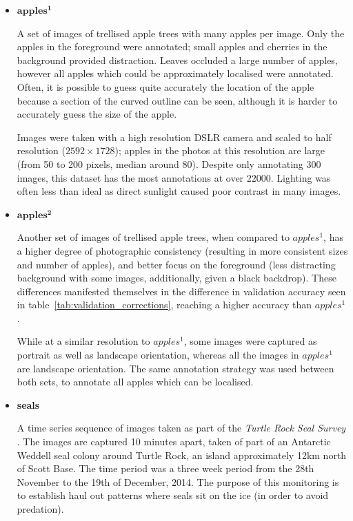 \begin{itemize}
    \item{$\mathbf{apples^1}$}

A set of images of trellised apple trees with many apples per image. Only the apples in the foreground were annotated; small apples and cherries in the background provided distraction. Leaves occluded a large number of apples, however all apples which could be approximately localised were annotated. Often, it is possible to guess quite accurately the location of the apple because a section of the curved outline can be seen, although it is harder to accurately guess the size of the apple. 

Images were taken with a high resolution DSLR camera and scaled to half resolution ($2592\times1728$); apples in the photos at this resolution are large (from 50 to 200 pixels, median around 80). Despite only annotating 300 images, this dataset has the most annotations at over $22000$. Lighting was often less than ideal as direct sunlight caused poor contrast in many images.
    
    \item{$\mathbf{apples^2}$}
    
Another set of images of trellised apple trees, when compared to \emph{$apples^1$}, has a higher degree of  photographic consistency (resulting in more consistent sizes and number of apples), and better focus on the foreground (less distracting background with some images, additionally, given a black backdrop). These differences manifested themselves in the difference in validation accuracy seen in table~\ref{tab:validation_corrections}, reaching a higher accuracy than \emph{$apples^1$}.

While at a similar resolution to \emph{$apples^1$}, some images were captured as portrait as well as landscape orientation, whereas all the images in \emph{$apples^1$} are landscape orientation. The same annotation strategy was used between both sets, to annotate all apples which can be localised.

    \item{\bf{seals}}
    
 A time series sequence of images taken as part of the \emph{Turtle Rock Seal Survey} \cite{Eisert2015}. The images are captured 10 minutes apart, taken of part of an Antarctic Weddell seal colony around Turtle Rock, an island approximately 12km north of Scott Base. The time period was a three week period from the 28th November to the 19th of December, 2014. The purpose of this monitoring is to establish haul out patterns where seals sit on the ice (in order to avoid predation).  


\end{itemize}
